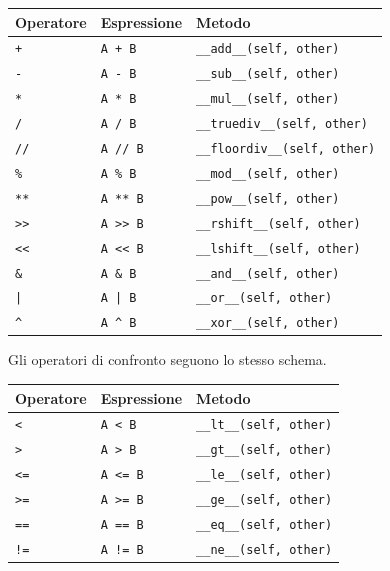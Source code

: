 \documentclass[12pt]{extarticle}
\begin{document}
\begin{center}
\small
\begin{tabular}{p{2.0cm}p{3.0cm}p{5.6cm}}
    \toprule
    \textbf{Operatore} & \textbf{Espressione} & \textbf{Metodo} \\
    \midrule
    \texttt{+} & \texttt{A + B} & \texttt{\_\_add\_\_(self, other)} \\
    \addlinespace
    \texttt{-} & \texttt{A - B} & \texttt{\_\_sub\_\_(self, other)} \\
    \addlinespace
    \texttt{*} & \texttt{A * B} & \texttt{\_\_mul\_\_(self, other)} \\
    \addlinespace
    \texttt{/} & \texttt{A / B} & \texttt{\_\_truediv\_\_(self, other)} \\
    \addlinespace
    \texttt{//} & \texttt{A // B} & \texttt{\_\_floordiv\_\_(self, other)} \\
    \addlinespace
    \texttt{\%} & \texttt{A \% B} & \texttt{\_\_mod\_\_(self, other)} \\
    \addlinespace
    \texttt{**} & \texttt{A ** B} & \texttt{\_\_pow\_\_(self, other)} \\
    \addlinespace
    \texttt{>>} & \texttt{A >> B} & \texttt{\_\_rshift\_\_(self, other)} \\
    \addlinespace
    \texttt{<<} & \texttt{A << B} & \texttt{\_\_lshift\_\_(self, other)} \\
    \addlinespace
    \texttt{\&} & \texttt{A \& B} & \texttt{\_\_and\_\_(self, other)} \\
    \addlinespace
    \texttt{|} & \texttt{A | B} & \texttt{\_\_or\_\_(self, other)} \\
    \addlinespace
    \texttt{\^{}} & \texttt{A \^{} B} & \texttt{\_\_xor\_\_(self, other)} \\
    \bottomrule
\end{tabular}
\end{center}

\noindent Gli operatori di confronto seguono lo stesso schema.

\begin{center}
\small
\begin{tabular}{p{2.0cm}p{3.0cm}p{5.6cm}}
    \toprule
    \textbf{Operatore} & \textbf{Espressione} & \textbf{Metodo} \\
    \midrule
    \texttt{<} & \texttt{A < B} & \texttt{\_\_lt\_\_(self, other)} \\
    \addlinespace
    \texttt{>} & \texttt{A > B} & \texttt{\_\_gt\_\_(self, other)} \\
    \addlinespace
    \texttt{<=} & \texttt{A <= B} & \texttt{\_\_le\_\_(self, other)} \\
    \addlinespace
    \texttt{>=} & \texttt{A >= B} & \texttt{\_\_ge\_\_(self, other)} \\
    \addlinespace
    \texttt{==} & \texttt{A == B} & \texttt{\_\_eq\_\_(self, other)} \\
    \addlinespace
    \texttt{!=} & \texttt{A != B} & \texttt{\_\_ne\_\_(self, other)} \\
    \bottomrule
\end{tabular}
\end{center}
\end{document}
